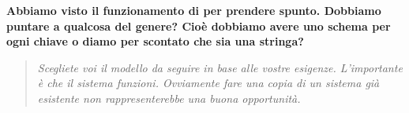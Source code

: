 \documentclass{scalatekids-article}
\begin{document}
\textbf{Abbiamo visto il funzionamento di  per prendere spunto. Dobbiamo puntare a qualcosa del genere? Cioè dobbiamo avere uno schema per ogni chiave o diamo per scontato che sia una stringa?}
\begin{quote}
  \textit{Scegliete voi il modello da seguire in base alle vostre esigenze.
    L'importante è che il sistema funzioni. Ovviamente fare una copia di un
    sistema già esistente non rappresenterebbe una buona opportunità.}
\end{quote}
\end{document}
